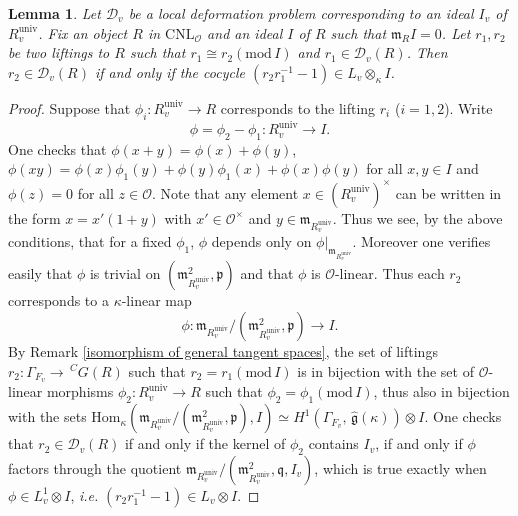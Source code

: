 \documentclass[12pt,oneside,reqno]{amsart}
\theoremstyle{plain}
\newtheorem{lemma}[theorem]{Lemma}
\begin{document}
	
	
	
	
	
	
	\begin{lemma}
		Let $\mathcal{D}_v$
		be a local deformation problem
		corresponding to an ideal
		$I_v$ of
		$R^\mathrm{univ}_v$.
		Fix an object
		$R$ in 
		$\mathrm{CNL}_\mathcal{O}$
		and an ideal
		$I$ of $R$
		such that
		$\mathfrak{m}_RI=0$.
		Let
		$r_1,r_2$ be two liftings to $R$ such that
		$r_1\cong r_2(\mathrm{mod}\,I)$
		and
		$r_1\in\mathcal{D}_v(R)$.
		Then
		$r_2\in\mathcal{D}_v(R)$
		if and only if the cocycle
		$(r_2r_1^{-1}-1)
		\in
		L_v\otimes_\kappa I$.
	\end{lemma}
	\begin{proof}
		Suppose that
		$\phi_i
		\colon
		R^\mathrm{univ}_v
		\rightarrow
		R$
		corresponds to the lifting
		$r_i$
		($i=1,2$).
		Write
		\[
		\phi=\phi_2-\phi_1
		\colon
		R^\mathrm{univ}_v
		\rightarrow
		I.
		\]
		One checks that
		$\phi(x+y)=\phi(x)+\phi(y)$,
		$\phi(xy)=\phi(x)\phi_1(y)
		+\phi(y)\phi_1(x)
		+
		\phi(x)\phi(y)$
		for all
		$x,y\in I$
		and
		$\phi(z)=0$
		for all
		$z\in\mathcal{O}$.
		Note that any element
		$x\in
		(R^\mathrm{univ}_v)^\times$
		can be written in the form
		$x=x'(1+y)$
		with
		$x'\in\mathcal{O}^\times$ and
		$y\in
		\mathfrak{m}_{R^\mathrm{univ}_v}$.
		Thus we see,
		by the above conditions,
		that
		for a fixed $\phi_1$,
		$\phi$ depends only on
		$\phi|_{\mathfrak{m}_{R^\mathrm{univ}_v}}$.
		Moreover one verifies easily that
		$\phi$ is trivial on
		$(\mathfrak{m}_{R^\mathrm{univ}_v}^2,\mathfrak{p})$
		and that
		$\phi$ is
		$\mathcal{O}$-linear.
		Thus each
		$r_2$
		corresponds to a $\kappa$-linear map
		\[
		\phi
		\colon
		\mathfrak{m}_{R^\mathrm{univ}_v}/
		(\mathfrak{m}_{R^\mathrm{univ}_v}^2,\mathfrak{p})
		\rightarrow
		I.
		\]
		By Remark
		\ref{isomorphism of general tangent spaces},
		the set of
		liftings
		$r_2\colon
		\Gamma_{F_v}
		\rightarrow
		\,
		^CG(R)$
		such that
		$r_2=r_1(\mathrm{mod}\,I)$
		is in bijection with
		the set of $\mathcal{O}$-linear morphisms
		$\phi_2
		\colon
		R^\mathrm{univ}_v
		\rightarrow
		R$
		such that
		$\phi_2=\phi_1
		(\mathrm{mod}\,I)$,
		thus also in bijection with the sets
		$\mathrm{Hom}_\kappa
		(\mathfrak{m}_{R^\mathrm{univ}_v}/
		(\mathfrak{m}_{R^\mathrm{univ}_v}^2,\mathfrak{p}),I)
		\simeq
		H^1(\Gamma_{F_v},
		\,
		\widehat{\mathfrak{g}}(\kappa))\otimes I$. One checks that
		$r_2\in
		\mathcal{D}_v(R)$
		if and only if the kernel of $\phi_2$ contains $I_v$,
		if and only if
		$\phi$
		factors through
		the quotient
		$\mathfrak{m}_{R^\mathrm{univ}_v}/
		(\mathfrak{m}_{R^\mathrm{univ}_v}^2,\mathfrak{q},I_v)$,
		which is true exactly when
		$\phi\in
		L_v^1\otimes I$,
		\emph{i.e.}
		$(r_2r_1^{-1}-1)
		\in
		L_v\otimes I$.
	\end{proof}
	
\end{document}

